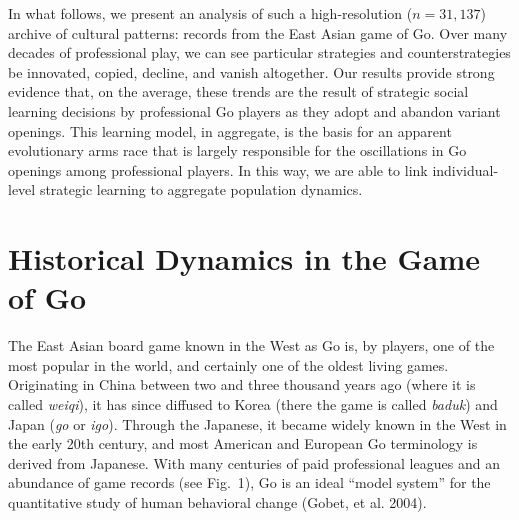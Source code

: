 \documentclass{article}
\begin{document}
In what follows, we present an analysis of such a high-resolution ($n=31,137$) archive of cultural patterns: records from the East Asian game of Go.  Over many decades of professional play, we can see particular strategies and counterstrategies be innovated, copied, decline, and vanish altogether.  Our results provide strong evidence that, on the average, these trends are the result of strategic social learning decisions by professional Go players as they adopt and abandon variant openings.  This learning model, in aggregate, is the basis for an apparent evolutionary arms race that is largely responsible for the oscillations in Go openings among professional players.  In this way, we are able to link individual-level strategic learning to aggregate population dynamics.

\section{Historical Dynamics in the Game of Go}

The East Asian board game known in the West as Go is, by players, one of the most popular in the world, and certainly one of the oldest living games.  Originating in China between two and three thousand years ago (where it is called \textit{weiqi}), it has since diffused to Korea (there the game is called \textit{baduk}) and Japan (\textit{go} or \textit{igo}).  Through the Japanese, it became widely known in the West in the early 20th century, and most American and European Go terminology is derived from Japanese.  With many centuries of paid professional leagues and an abundance of game records (see Fig.~1), Go is an ideal ``model system'' for the quantitative study of human behavioral change (Gobet, et al. 2004). 
\end{document}
